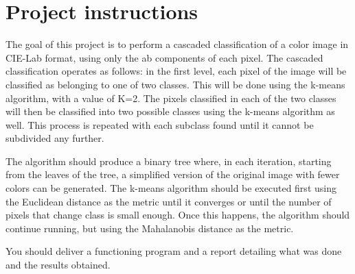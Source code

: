 \section{Project instructions}\label{sec:project-instructions}
The goal of this project is to perform a cascaded classification of a color image in CIE-Lab format, using only the ab components of each pixel.
The cascaded classification operates as follows: in the first level, each pixel of the image will be classified as belonging to one of two classes.
This will be done using the k-means algorithm, with a value of K=2.
The pixels classified in each of the two classes will then be classified into two possible classes using the k-means algorithm as well.
This process is repeated with each subclass found until it cannot be subdivided any further.

The algorithm should produce a binary tree where, in each iteration, starting from the leaves of the tree, a simplified version of the original image with fewer colors can be generated.
The k-means algorithm should be executed first using the Euclidean distance as the metric until it converges or until the number of pixels that change class is small enough.
Once this happens, the algorithm should continue running, but using the Mahalanobis distance as the metric.

You should deliver a functioning program and a report detailing what was done and the results obtained.
